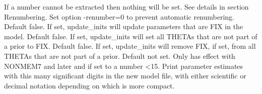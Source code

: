\begin{optionlist}
If a number cannot be extracted then nothing will be set. 
\nextopt
{}
See details in section Renumbering.
Set option -renumber=0 to prevent automatic renumbering.
\nextopt
{}
Default false. If set, update\_inits will update parameters that are FIX in the model.
\nextopt
{}
Default false. If set, update\_inits will set all THETAs that are not part of a prior to FIX.
\nextopt
{}
Default false. If set, update\_inits will remove FIX, if set, from all THETAs that are not part of a prior.
\nextopt
{}
Default not set.
Only has effect with NONMEM7 and later and if set to a number <15. 
Print parameter
estimates with this many significant digits in the new model file,
with either scientific or decimal notation depending on which is more compact.
\nextopt
\end{optionlist}



